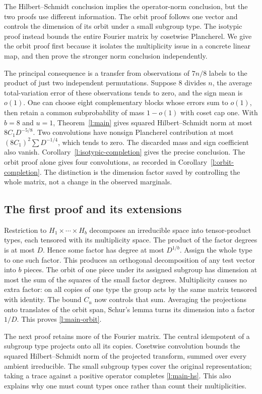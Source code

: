 The Hilbert--Schmidt conclusion implies the operator-norm conclusion, but the two proofs use different information. The orbit proof follows one vector and controls the dimension of its orbit under a small subgroup type. The isotypic proof instead bounds the entire Fourier matrix by cosetwise Plancherel. We give the orbit proof first because it isolates the multiplicity issue in a concrete linear map, and then prove the stronger norm conclusion independently.

The principal consequence is a transfer from observations of $7n/8$ labels to the product of just two independent permutations. Suppose $8$ divides $n$, the average total-variation error of these observations tends to zero, and the sign mean is $o(1)$. One can choose eight complementary blocks whose errors sum to $o(1)$, then retain a common subprobability of mass $1-o(1)$ with coset cap one. With $b=8$ and $u=1$, Theorem~\ref{l:main} gives squared Hilbert--Schmidt norm at most $8C_1D^{-5/8}$. Two convolutions have nonsign Plancherel contribution at most $(8C_1)^2\sum D^{-1/4}$, which tends to zero. The discarded mass and sign coefficient also vanish. Corollary~\ref{l:isotypic-completion} gives the precise conclusion. The orbit proof alone gives four convolutions, as recorded in Corollary~\ref{l:orbit-completion}. The distinction is the dimension factor saved by controlling the whole matrix, not a change in the observed marginals.

\subsection{The first proof and its extensions}

Restriction to $H_1\times\cdots\times H_b$ decomposes an irreducible space into tensor-product types, each tensored with its multiplicity space. The product of the factor degrees is at most $D$. Hence some factor has degree at most $D^{1/b}$. Assign the whole type to one such factor. This produces an orthogonal decomposition of any test vector into $b$ pieces. The orbit of one piece under its assigned subgroup has dimension at most the sum of the squares of the small factor degrees. Multiplicity causes no extra factor: on all copies of one type the group acts by the same matrix tensored with identity. The bound $C_u$ now controls that sum. Averaging the projections onto translates of the orbit span, Schur's lemma turns its dimension into a factor $1/D$. This proves \eqref{l:main-orbit}.

The next proof retains more of the Fourier matrix. The central idempotent of a subgroup type projects onto all its copies. Cosetwise convolution bounds the squared Hilbert--Schmidt norm of the projected transform, summed over every ambient irreducible. The small subgroup types cover the original representation; taking a trace against a positive operator completes \eqref{l:main-hs}. This also explains why one must count types once rather than count their multiplicities.

